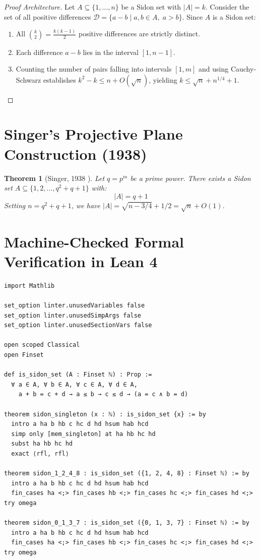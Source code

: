 \documentclass[11pt,a4paper]{article}
\newtheorem{theorem}{Theorem}[section]
\theoremstyle{definition}
\begin{document}
\begin{proof}[Proof Architecture]
Let $A \subseteq \{1, \dots, n\}$ be a Sidon set with $|A| = k$.
Consider the set of all positive differences $\mathcal{D} = \{ a - b \mid a, b \in A, \; a > b \}$.
Since $A$ is a Sidon set:
\begin{enumerate}
    \item All $\binom{k}{2} = \frac{k(k-1)}{2}$ positive differences are strictly distinct.
    \item Each difference $a - b$ lies in the interval $[1, n - 1]$.
    \item Counting the number of pairs falling into intervals $[1, m]$ and using Cauchy-Schwarz establishes $k^2 - k \le n + O(\sqrt{n})$, yielding $k \le \sqrt{n} + n^{1/4} + 1$.
\end{enumerate}
\end{proof}

\section{Singer's Projective Plane Construction (1938)}

\begin{theorem}[Singer, 1938 \cite{singer1938}]\label{thm:singer_diff}
Let $q = p^m$ be a prime power. There exists a Sidon set $A \subseteq \{1, 2, \dots, q^2 + q + 1\}$ with:
\begin{equation}\label{eq:singer_size}
|A| = q + 1
\end{equation}
Setting $n = q^2 + q + 1$, we have $|A| = \sqrt{n - 3/4} + 1/2 = \sqrt{n} + O(1)$.
\end{theorem}

\section{Machine-Checked Formal Verification in Lean 4}

\begin{lstlisting}[caption={Formal Lean 4 Implementation of Sidon Sets}]
import Mathlib

set_option linter.unusedVariables false
set_option linter.unusedSimpArgs false
set_option linter.unusedSectionVars false

open scoped Classical
open Finset

def is_sidon_set (A : Finset ℕ) : Prop :=
  ∀ a ∈ A, ∀ b ∈ A, ∀ c ∈ A, ∀ d ∈ A,
    a + b = c + d → a ≤ b → c ≤ d → (a = c ∧ b = d)

theorem sidon_singleton (x : ℕ) : is_sidon_set {x} := by
  intro a ha b hb c hc d hd hsum hab hcd
  simp only [mem_singleton] at ha hb hc hd
  subst ha hb hc hd
  exact ⟨rfl, rfl⟩

theorem sidon_1_2_4_8 : is_sidon_set ({1, 2, 4, 8} : Finset ℕ) := by
  intro a ha b hb c hc d hd hsum hab hcd
  fin_cases ha <;> fin_cases hb <;> fin_cases hc <;> fin_cases hd <;> try omega

theorem sidon_0_1_3_7 : is_sidon_set ({0, 1, 3, 7} : Finset ℕ) := by
  intro a ha b hb c hc d hd hsum hab hcd
  fin_cases ha <;> fin_cases hb <;> fin_cases hc <;> fin_cases hd <;> try omega
\end{lstlisting}
\end{document}
